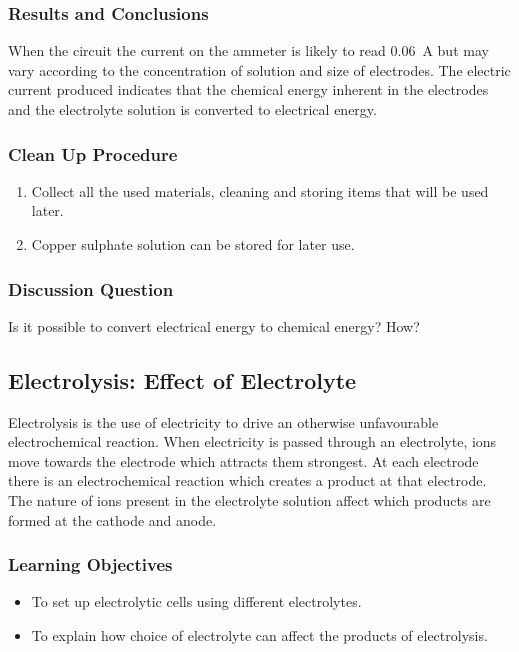 \subsubsection*{Results and Conclusions}
When the circuit the current on the ammeter is likely to read 0.06~A but may vary according to the concentration of solution and size of electrodes. The electric current produced indicates that the chemical energy inherent in the electrodes and the electrolyte solution is converted to electrical energy.

\subsubsection*{Clean Up Procedure}
\begin{enumerate}
\item{Collect all the used materials, cleaning and storing items that will be used later.}
\item{Copper sulphate solution can be stored for later use.}
\end{enumerate}

\subsubsection*{Discussion Question}
Is it possible to convert electrical energy to chemical energy? How?


\subsection{Electrolysis: Effect of Electrolyte}

Electrolysis is the use of electricity to drive an otherwise unfavourable electrochemical reaction. When electricity is passed through an electrolyte, ions move towards the electrode which attracts them strongest. At each electrode there is an electrochemical reaction which creates a product at that electrode. The nature of ions present in the electrolyte solution affect which products are formed at the cathode and anode.

\subsubsection*{Learning Objectives}
\begin{itemize}
\item{To set up electrolytic cells using different electrolytes.}
\item{To explain how choice of electrolyte can affect the products of electrolysis.}
\end{itemize}

